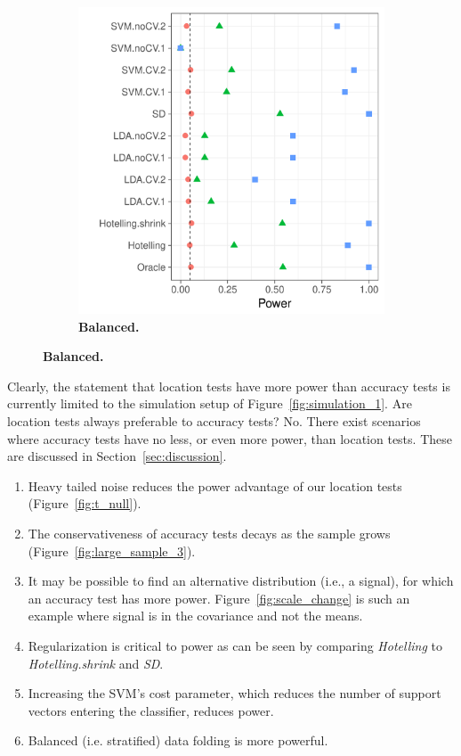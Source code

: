 \documentclass[12pt,a4paper]{article}
\begin{document}
\begin{figure}[h]
\begin{subfigure}{.5\textwidth}
		\includegraphics[width=1\linewidth]{"art/file2"}
		\caption{\textbf{Balanced.}} %
		\label{fig:simulation_12}
	\end{subfigure}
\end{figure}


Clearly, the statement that location tests have more power than accuracy tests is currently limited to the simulation setup of Figure~\ref{fig:simulation_1}.
Are location tests always preferable to accuracy tests?
No. 
There exist scenarios where accuracy tests have no less, or even more power, than location tests.
These are discussed in Section~\ref{sec:discussion}.



\begin{enumerate}
\item Heavy tailed noise reduces the power advantage of our location tests (Figure~\ref{fig:t_null}).

\item The conservativeness of accuracy tests decays as the sample grows (Figure~\ref{fig:large_sample_3}).

\item It may be possible to find an alternative distribution (i.e., a signal), for which an accuracy test has more power. 
Figure~\ref{fig:scale_change} is such an example where signal is in the covariance and not the means.

\item Regularization is critical to power as can be seen by comparing \emph{Hotelling} to \emph{Hotelling.shrink} and \emph{SD}.

\item Increasing the SVM's cost parameter, which reduces the number of support vectors entering the classifier, reduces power. 

\item Balanced (i.e. stratified) data folding is more powerful.

\end{enumerate}
\end{document}
